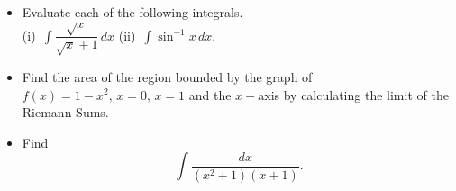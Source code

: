 \documentclass[12pt]{uz-exame}
\begin{document}
\begin{question}
\begin{itemize}
\item[(a)] Evaluate each of the following integrals.\\
(i)\, $\displaystyle \int \dfrac{\sqrt{x}}{\sqrt{x}+1}\, dx$ \quad \quad (ii)\, $\displaystyle \int \sin ^{-1} x\, dx$. 
\item[(b)] Find the area of the region bounded by the graph of $f(x)=1-x^2, \, x=0, \, x=1$ and the $x-$axis by calculating the limit of the Riemann Sums. 
\item[(c)] Find 
\[\int \dfrac{dx}{(x^2+1)(x+1)}.\] 
\end{itemize}
\end{question}
\endexam
\end{document}
